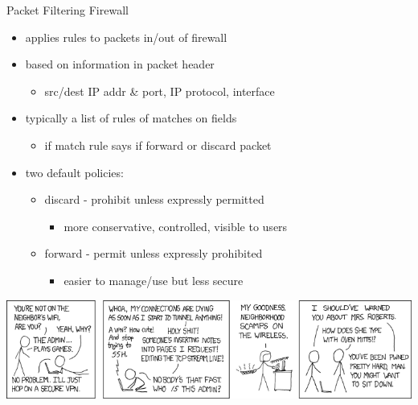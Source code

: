 \documentclass{beamer}
\begin{document}
\begin{frame}{Packet Filtering Firewall}
  \begin{itemize}
  \item applies rules to packets in/out of firewall 
  \item based on information in packet header 
    \begin{itemize}
    \item src/dest IP addr \& port, IP protocol, interface 
    \end{itemize}
  \item typically a list of rules of matches on fields 
    \begin{itemize}
    \item if match rule says if forward or discard packet 
    \end{itemize}
  \item two default policies: 
    \begin{itemize}
    \item discard - prohibit unless expressly permitted 
      \begin{itemize}
      \item more conservative, controlled, visible to users 
      \end{itemize}
    \end{itemize}
    \begin{itemize}
    \item forward - permit unless expressly prohibited 
      \begin{itemize}
      \item easier to manage/use but less secure 
      \end{itemize}
    \end{itemize}
  \end{itemize}
\end{frame}

\begin{frame}{}
  \begin{center}
    \includegraphics[width=1\linewidth]{1337_part_1}
  \end{center}
\end{frame}
\end{document}
